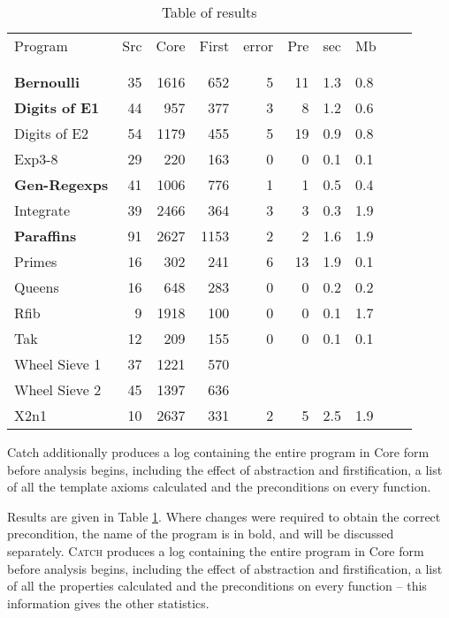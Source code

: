 \documentclass[preprint]{sigplanconf}
\newcommand{\C}[1]{\textsf{#1}}
\newcommand{\catch}{\textsc{Catch}}
\begin{document}
\begin{table}
\begin{tabular}{lrrrrrrlll}
Program               & Src & Core & First & \C{error} & Pre & sec & Mb \\
\vspace{-2.2ex} \\
\hline
\vspace{-1.8ex} \\
\textbf{Bernoulli}    & 35 & 1616 &  652 & 5 & 11 & 1.3 & 0.8 \\
\textbf{Digits of E1} & 44 &  957 &  377 & 3 &  8 & 1.2 & 0.6 \\
Digits of E2          & 54 & 1179 &  455 & 5 & 19 & 0.9 & 0.8 \\
Exp3-8                & 29 &  220 &  163 & 0 &  0 & 0.1 & 0.1 \\
\textbf{Gen-Regexps}  & 41 & 1006 &  776 & 1 &  1 & 0.5 & 0.4 \\
Integrate             & 39 & 2466 &  364 & 3 &  3 & 0.3 & 1.9 \\
\textbf{Paraffins}    & 91 & 2627 & 1153 & 2 &  2 & 1.6 & 1.9 \\
Primes                & 16 &  302 &  241 & 6 & 13 & 1.9 & 0.1 \\
Queens                & 16 &  648 &  283 & 0 &  0 & 0.2 & 0.2 \\
Rfib                  &  9 & 1918 &  100 & 0 &  0 & 0.1 & 1.7 \\
Tak                   & 12 &  209 &  155 & 0 &  0 & 0.1 & 0.1 \\
Wheel Sieve 1         & 37 & 1221 &  570 \\
Wheel Sieve 2         & 45 & 1397 &  636 \\
X2n1                  & 10 & 2637 &  331 & 2 &  5 & 2.5 & 1.9 \\
\end{tabular}
\caption{Table of results}
\label{tab:results}
\end{table}

Catch additionally produces a log containing the entire program in Core form before analysis begins, including the effect of abstraction and firstification, a list of all the template axioms calculated and the preconditions on every function.

Results are given in Table \ref{tab:results}. Where changes were required to obtain the correct precondition, the name of the program is in bold, and will be discussed separately. \catch{} produces a log containing the entire program in Core form before analysis begins, including the effect of abstraction and firstification, a list of all the properties calculated and the preconditions on every function -- this information gives the other statistics.
\end{document}
